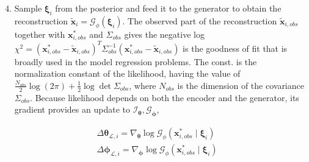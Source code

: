 \documentclass[10pt]{article}
\begin{document}
\begin{enumerate}
  \setcounter{enumi}{3}
  \item Sample $\boldsymbol{\xi}_{i}$ from the posterior and feed it to the generator to obtain the reconstruction $\tilde{\boldsymbol{x}}_{i}=\mathcal{G}_{\phi}\left(\boldsymbol{\xi}_{i}\right)$. The observed part of the reconstruction $\tilde{\boldsymbol{x}}_{i, o b s}$ together with $\boldsymbol{x}_{i, o b s}^{*}$ and $\Sigma_{o b s}$ gives the negative log $\chi^{2}=\left(\boldsymbol{x}_{i, o b s}^{*}-\tilde{\boldsymbol{x}}_{i, o b s}\right)^{T} \Sigma_{o b s}^{-1}\left(\boldsymbol{x}_{i, o b s}^{*}-\tilde{\boldsymbol{x}}_{i, o b s}\right)$ is the goodness of fit that is broadly used in the model regression problems. The const. is the normalization constant of the likelihood, having the value of $\frac{N_{o b s}}{2} \log (2 \pi)+\frac{1}{2} \log \operatorname{det} \Sigma_{o b s}$, where $N_{o b s}$ is the dimension of the covariance $\Sigma_{o b s}$. Because likelihood depends on both the encoder and the generator, its gradient provides an update to $\mathcal{I}_{\boldsymbol{\theta}}, \mathcal{G}_{\boldsymbol{\phi}}$,
\end{enumerate}
$$
\begin{aligned}
&\Delta \boldsymbol{\theta}_{\mathcal{L}, i}=\nabla_{\boldsymbol{\theta}} \log \mathcal{G}_{\phi}\left(\boldsymbol{x}_{i, o b s}^{*} \mid \boldsymbol{\xi}_{i}\right) \\
&\Delta \boldsymbol{\phi}_{\mathcal{L}, i}=\nabla_{\boldsymbol{\phi}} \log \mathcal{G}_{\phi}\left(\boldsymbol{x}_{i, o b s}^{*} \mid \boldsymbol{\xi}_{i}\right)
\end{aligned}
$$
\end{document}
